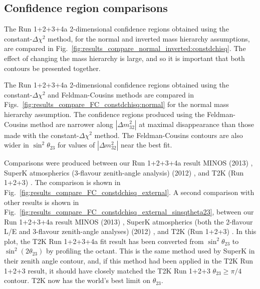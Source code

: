 \subsection {Confidence region comparisons}
\label{sec:results_contour_comparisons}

The Run 1+2+3+4a 2-dimensional confidence regions obtained using the constant-$\Delta\chi^2$ method,
for the normal and inverted mass hierarchy assumptions,
are compared in Fig.\ \ref{fig:results_compare_normal_inverted:constdchisq}.
The effect of changing the mass hierarchy is large, and so it is important
that both contours be presented together.

The Run 1+2+3+4a 2-dimensional confidence regions obtained using the constant-$\Delta\chi^2$ and Feldman-Cousins methods
are compared in Figs.\ \ref{fig:results_compare_FC_constdchisq:normal} %
for the normal mass hierarchy assumption.
The confidence regions produced
using the Feldman-Cousins method are narrower along $|\Delta{m^{2}_{32}}|$ at maximal disappearance than
those made with the constant-$\Delta\chi^{2}$ method.
The Feldman-Cousins contours are also wider
in $\sin^{2}{\theta_{23}}$ for values of $|\Delta{m^{2}_{32}}|$ near the best fit.

Comparisons were produced between our Run 1+2+3+4a result
MINOS (2013) \cite{MINOS2013sinsqtheta}, SuperK atmospherics 
(3-flavour 
zenith-angle analysis) (2012) \cite{SKAtm2012},
and T2K (Run 1+2+3) \cite{T2KRun123Disapp}.
The comparison is shown in Fig.\ \ref{fig:results_compare_FC_constdchisq_external}.
A second comparison with other results is shown in Fig.\ \ref{fig:results_compare_FC_constdchisq_external_sinsqtheta23},
between our Run 1+2+3+4a result
MINOS (2013) \cite{MINOS2013}, SuperK atmospherics 
(both the 2-flavour L/E and 3-flavour 
zenith-angle analyses) (2012) \cite{SKAtm2012},
and T2K (Run 1+2+3) \cite{T2KRun123Disapp}.
In this plot, the T2K Run 1+2+3+4a fit result has been converted from $\sin^2\theta_{23}$ to
$\sin^2(2\theta_{23})$ by profiling the octant.
This is the same method used by SuperK in their zenith angle contour, and,
if this method had been applied in the T2K Run 1+2+3 result, it should have
closely matched the T2K Run 1+2+3 $\theta_{23} \geq \pi/4$ contour.
T2K now has the world's best limit on $\theta_{23}$.


